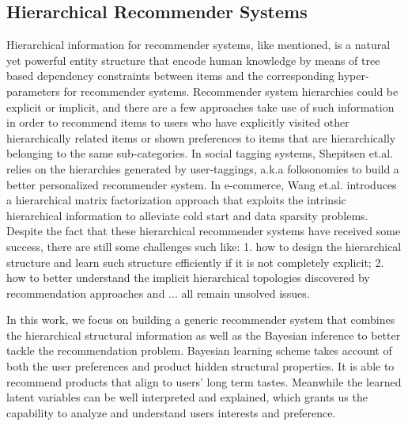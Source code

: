 \subsection{Hierarchical Recommender Systems}

Hierarchical information for recommender systems, like mentioned, is a natural yet powerful entity structure that encode human knowledge by means of tree based dependency constraints between items and the corresponding hyper-parameters for recommender systems.  Recommender system hierarchies could be explicit or implicit, and there are a few approaches take use of such information in order to recommend items to users who have explicitly visited other hierarchically related items or shown preferences to items that are hierarchically belonging to the same sub-categories.  In social tagging systems, Shepitsen et.al. \cite{shepitsen2008personalized} relies on the hierarchies generated by user-taggings, a.k.a folksonomies to build a better personalized recommender system.  In e-commerce, Wang et.al. \cite{wang2018exploring} introduces a hierarchical matrix factorization approach that exploits the intrinsic hierarchical information to alleviate cold start and data sparsity problems.  Despite the fact that these hierarchical recommender systems have received some success, there are still some challenges such like: 1. how to design the hierarchical structure and learn such structure efficiently if it is not completely explicit; 2. how to better understand the implicit hierarchical topologies discovered by recommendation approaches and ... all remain unsolved issues.

In this work, we focus on building a generic recommender system that combines the hierarchical structural information as well as the Bayesian inference to better tackle the recommendation problem.  Bayesian learning scheme takes account of both the user preferences and product hidden structural properties. It is able to recommend products that align to users' long term tastes. Meanwhile the learned latent variables can be well interpreted and explained, which grants us the capability to analyze and understand users interests and preference.
